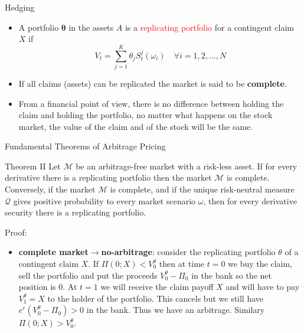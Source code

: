 \documentclass{beamer}
\begin{document}
\begin{frame}{Hedging}
	\begin{itemize}
		\item A portfolio $\mathbf{\theta}$ in the assets $A$ is a \textcolor{red}{replicating portfolio} for a contingent claim $X$ if
		\begin{equation}
			V_t = \sum_{j=1}^K \theta_j S_t^j(\omega_i)\quad\forall i=1,2,\ldots,N
		\end{equation}
	\item If all claims (assets) can be replicated the market is said to be \textbf{complete}.
	\item From a financial point of view, there is no difference between holding the claim and holding the portfolio, no matter what happens on the stock market, the value of the claim and of the stock will be the same.
	\end{itemize}
\end{frame}

\begin{frame}{Fundamental Theorems of Arbitrage Pricing}
	\begin{block}{Theorem II}
		Let $\mathcal{M}$ be an arbitrage-free market with a risk-less asset. If for every derivative there is a replicating portfolio %
		then the market $\mathcal{M}$ is complete. Conversely, if the market $\mathcal{M}$ is complete, and if the unique risk-neutral measure $\mathcal{Q}$ gives positive probability to every market scenario $\omega$, then for every derivative security there is a replicating portfolio.%
	\end{block}
	Proof:
	\begin{itemize}
		\item \textbf{complete market$\rightarrow$no-arbitrage}: consider the replicating portfolio $\theta$ of a contingent claim $X$. If $\Pi(0; X) < V_0^\theta$ then at time $t=0$ we buy the claim, sell the portfolio and put the proceeds $V_0^\theta-\Pi_0$ in the bank so the net position is 0. At $t=1$ we will receive the claim payoff $X$ and will have to pay $V_1^\theta =X$  to the holder of the portfolio. This cancels but we still have $e^r(V_0^\theta-\Pi_0)>0$ in the bank. Thus we have an arbitrage. Similary $\Pi(0; X) > V_0^\theta$.
	\end{itemize}
\end{frame}
\end{document}
